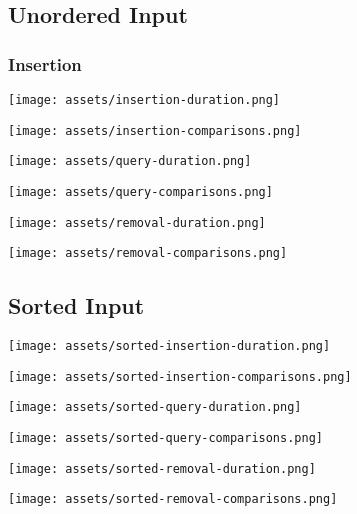 \documentclass[12pt]{elsarticle}
\begin{document}
\subsection{Unordered Input}
\subsubsection{Insertion}
\begin{center}\texttt{[image: assets/insertion-duration.png]}\end{center}
\begin{center}\texttt{[image: assets/insertion-comparisons.png]}\end{center}

\begin{center}\texttt{[image: assets/query-duration.png]}\end{center}
\begin{center}\texttt{[image: assets/query-comparisons.png]}\end{center}
\begin{center}\texttt{[image: assets/removal-duration.png]}\end{center}
\begin{center}\texttt{[image: assets/removal-comparisons.png]}\end{center}

\subsection{Sorted Input}
\begin{center}\texttt{[image: assets/sorted-insertion-duration.png]}\end{center}
\begin{center}\texttt{[image: assets/sorted-insertion-comparisons.png]}\end{center}
\begin{center}\texttt{[image: assets/sorted-query-duration.png]}\end{center}
\begin{center}\texttt{[image: assets/sorted-query-comparisons.png]}\end{center}
\begin{center}\texttt{[image: assets/sorted-removal-duration.png]}\end{center}
\begin{center}\texttt{[image: assets/sorted-removal-comparisons.png]}\end{center}
\end{document}
